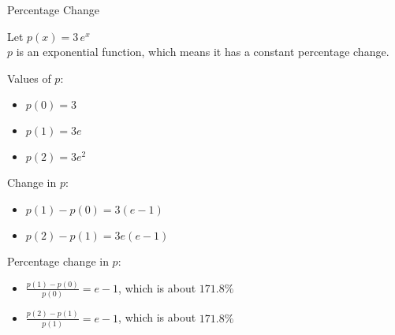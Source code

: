 \documentclass{ximera}
\begin{document}
\begin{example} Percentage Change



Let $p(x) = 3 \, e^x$ \\

$p$ is an exponential function, which means it has a constant percentage change. \\



\begin{explanation}

Values of $p$:

\begin{itemize}
\item $p(0) = 3$

\item $p(1) = 3 e$

\item $p(2) = 3 e^2$
\end{itemize}



Change in $p$:

\begin{itemize}
\item $p(1) - p(0) = 3 (e-1)$

\item $p(2) - p(1) = 3 e (e-1)$

\end{itemize}





Percentage change in $p$:

\begin{itemize}
\item $\frac{p(1) - p(0)}{p(0)} = e - 1$, which is about $171.8\%$

\item $\frac{p(2) - p(1)}{p(1)} = e-1 $, which is about $171.8\%$

\end{itemize}

\end{explanation}

\end{example}
\end{document}
